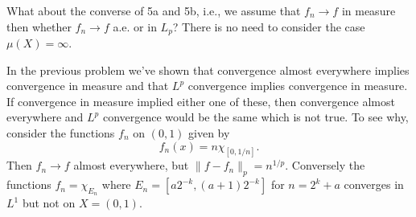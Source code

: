 \documentclass[11pt,letterpaper]{article}
\begin{document}
\begin{problem}
    What about the converse of 5a and 5b, i.e., we assume that $f_n \to f$ in measure then whether $f_n \to f$ a.e. or in $L_p$? There is no need to consider the case $\mu(X)=\infty$.  
\end{problem}

\begin{solution}
    \quad In the previous problem we've shown that convergence almost everywhere implies convergence in measure and that $L^p$ convergence implies convergence in measure. If convergence in measure implied either one of these, then convergence almost everywhere and $L^p$ convergence would be the same which is not true. To see why, consider the functions $f_n$ on $(0,1)$ given by
    \[
        f_n(x) = n\chi_{[0,1 /n]}
    .\]  
    Then $f_n \to f$ almost everywhere, but $\|f-f_n\|_p =n^{1 / p}$. Conversely the functions $f_n=\chi_{E_n}$ where $E_n=[a 2^{-k}, (a+1)2^{-k}]$ for $n=2^k+a$ converges in $L^1$ but not on $X=(0,1)$.
\end{solution}
\end{document}
